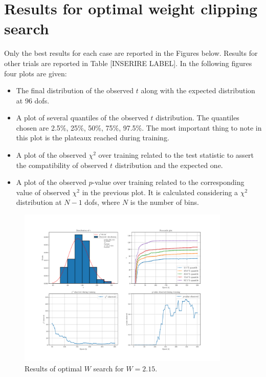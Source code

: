 \section{Results for optimal weight clipping search}
Only the best results for each case are reported in the Figures below. Results for other trials are reported in Table [INSERIRE LABEL]. In the following figures four plots are given:
\begin{itemize}
	\item The final distribution of the observed $t$ along with the expected distribution at 96 dofs.
	\item A plot of several quantiles of the observed $t$ distribution. The quantiles chosen are 2.5\%, 25\%, 50\%, 75\%, 97.5\%. The most important thing to note in this plot is the plateaux reached during training.
	\item A plot of the observed $\chi^2$ over training related to the test statistic to assert the compatibility of observed $t$ distribution and the expected one.
	\item A plot of the observed $p$-value over training related to the corresponding value of observed $\chi^2$ in the previous plot. It is calculated considering a $\chi^2$ distribution at $N-1$ dofs, where $N$ is the number of bins.
\end{itemize}

\begin{figure}[H]
	\centering
	\includegraphics[width=0.9\textwidth]{Python/W_CLIP/ref100000_bkg20000_sig0/data_ref100000_bkg20000_sig0_wclip2-15.pdf}
	\caption{Results of optimal $W$ search for $W=2.15$.}
	\label{fig:REF100000_BKG20000_SIG0_WCLIP2.15}
\end{figure}

